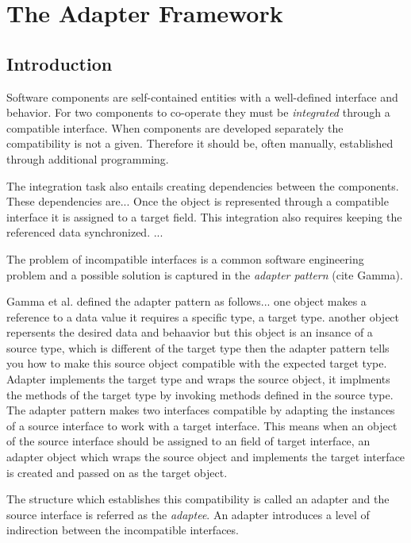 \chapter{The Adapter Framework}

\section{Introduction}
\label{sec:adapter:intro}


Software components are self-contained entities with a well-defined interface and behavior. 
For two components to co-operate they must be \emph{integrated} through a compatible interface. 
When components are developed separately the compatibility is not a given. 
Therefore it should be, often manually, established through additional programming. 


The integration task also entails creating dependencies between the components. 
These dependencies are...
Once the object is represented through a compatible interface it is assigned to a target field. 
This integration also requires keeping the referenced data synchronized. 
...

The problem of incompatible interfaces is a common software engineering problem and a possible  solution is captured in the \emph{adapter pattern} (cite Gamma).

Gamma et al. defined the adapter pattern as follows... one object makes a reference to a data value it requires a specific type, a target type. another object repersents the desired data and behaavior but this object is an insance of a source type, which is different of the target type then the adapter pattern tells you how to make this source object compatible with the expected target type. 
Adapter implements the target type and wraps the source object, it implments the methods of the target type by invoking methods defined in the source type.
The adapter pattern makes two interfaces compatible by adapting the instances of a source interface to work with a target interface. 
This means when an object of the source interface should be assigned to an field of target interface, an adapter object which wraps the source object and implements the target interface is created and passed on as the target object. 

The structure which establishes this compatibility is called an adapter and the source interface is referred as the \emph{adaptee}. 
An adapter introduces  a level of indirection between the incompatible interfaces.

